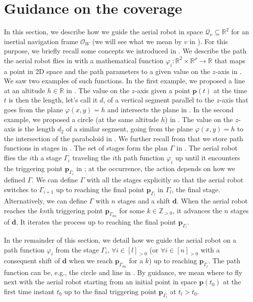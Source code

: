 \section{Guidance on the coverage}\label{sec:gvf}

In this section, we describe how we guide the aerial robot in space $\mathcal{Q}_v\subseteq\mathbb{R}^2$ for an inertial navigation frame $\mathcal{O}_W$ (we will see what we mean by $v$ in ). For this purpose, we briefly recall some concepts we introduced in . We describe the path the aerial robot flies in  with a mathematical function $\varphi_i:\mathbb{R}^2\times\mathbb{R}^\rho\rightarrow\mathbb{R}$ that maps a point in 2D space and the path parameters to a given value on the $z$-axis in . We saw two examples of such functions. In the first example, we proposed a line at an altitude $h\in\mathbb{R}$ in . The value on the $z$-axis given a point $\mathbf{p}(t)$ at the time $t$ is then the length, let's call it $d$, of a vertical segment parallel to the $z$-axis that goes from the plane $\varphi(x,y)=h$ and intersects the plane in . In the second example, we proposed a circle (at the same altitude $h$) in . The value on the $z$-axis is the length $d_2$ of a similar segment, going from the plane $\varphi(x,y)=h$ to the intersection of the paraboloid in . We further recall from  that we store path functions in stages in . The set of stages form the plan $\Gamma$ in . The aerial robot flies the $i$th a stage $\Gamma_i$ traveling the $i$th path function $\varphi_i$ up until it encounters the triggering point $\mathbf{p}_{\Gamma_i}$ in ; at the occurrence, the action depends on how we defined $\Gamma$. We can define $\Gamma$ with all the stages explicitly so that the aerial robot switches to $\Gamma_{i+1}$ up to reaching the final point $\mathbf{p}_{\Gamma_l}$ in $\Gamma_l$, the final stage. Alternatively, we can define $\Gamma$ with $n$ stages and a shift $\mathbf{d}$. When the aerial robot reaches the $kn$th triggering point $\mathbf{p}_{\Gamma_{kn}}$ for some $k\in\mathbb{Z}_{>0}$, it advances the $n$ stages of $\mathbf{d}$. It iterates the process up to reaching the final point $\mathbf{p}_{\Gamma_l}$.

In the remainder of this section, we detail how we guide the aerial robot on a path function $\varphi_i$ from the stage $\Gamma_i,\,\forall i\in[l]_{>0}$ (or $\forall i\in[n]_{>0}$ with a consequent shift of $\mathbf{d}$ when we reach $\mathbf{p}_{\Gamma_{kn}}$ for a $k$) up to reaching $\mathbf{p}_{\Gamma_l}$. The path function can be, e.g., the circle and line in . By guidance, we mean where to fly next with the aerial robot starting from an initial point in space $\mathbf{p}(t_0)$ at the first time instant $t_0$ up to the final triggering point $\mathbf{p}_{\Gamma_l}$ at $t_l>t_0$.


